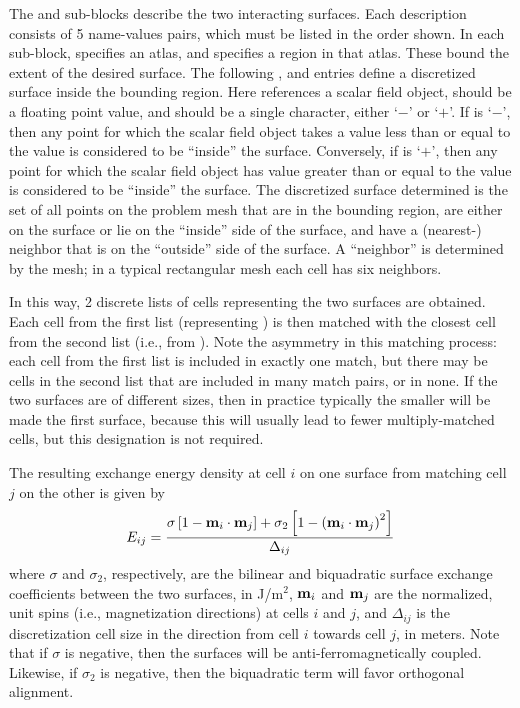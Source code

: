 \begin{itemize}
\begin{description}
   The  and  sub-blocks describe
   the two interacting surfaces.  Each description consists of 5
   name-values pairs, which must be listed in the order shown.  In each
   sub-block,  specifies an atlas, and
    specifies a region in that atlas.  These bound
   the extent of the desired surface.  The following
   ,  and
    entries define a discretized surface inside the
   bounding region.  Here  references a scalar
   field object,  should be a floating point value,
   and  should be a single character, either `$-$' or
   `$+$'.  If  is `$-$', then any point for which the
   scalar field object takes a value less than or equal to the
    value is considered to be ``inside'' the surface.
   Conversely, if  is `$+$', then any point for which the
   scalar field object has value greater than or equal to the
    value is considered to be ``inside'' the surface.
   The discretized surface determined is the set of all points on the
   problem mesh that are in the bounding region, are either on the
   surface or lie on the ``inside'' side of the surface, and have a
   (nearest-) neighbor that is on the ``outside'' side of the surface.
   A ``neighbor'' is determined by the mesh; in a typical rectangular
   mesh each cell has six neighbors.

   In this way, 2 discrete lists of cells representing the two
   surfaces are obtained.  Each cell from the first list (representing
   ) is then matched with the closest cell from the
   second list (i.e., from ).  Note the asymmetry in
   this matching process: each cell from the first list is included in
   exactly one match, but there may be cells in the second list that
   are included in many match pairs, or in none.  If the two surfaces
   are of different sizes, then in practice typically the smaller will
   be made the first surface, because this will usually lead to fewer
   multiply-matched cells, but this designation is not required.

   The resulting exchange energy density at cell $i$ on one surface
   from matching cell $j$ on the other is given by
   \begin{displaymath}
        E_{ij} =  \frac{\sigma\left[1-\textbf{m}_i\cdot\textbf{m}_j\right]
         +\sigma_2\left[1-\left(\textbf{m}_i\cdot\textbf{m}_j\right)^2\right]
        }{\Delta_{ij}}
   \end{displaymath}
   where $\sigma$ and $\sigma_2$, respectively, are the bilinear and
   biquadratic surface exchange coefficients between the two surfaces,
   in J/m${}^2$, $\textbf{m}_i$ and $\textbf{m}_j$ are the normalized, unit spins
   (i.e., magnetization directions) at cells $i$ and $j$, and
   $\Delta_{ij}$ is the discretization cell size in the direction from
   cell $i$ towards cell $j$, in meters.  Note that if $\sigma$ is
   negative, then the surfaces will be anti-ferromagnetically coupled.
   Likewise, if $\sigma_2$ is negative, then the biquadratic term will
   favor orthogonal alignment.


\end{description}
\end{itemize}
